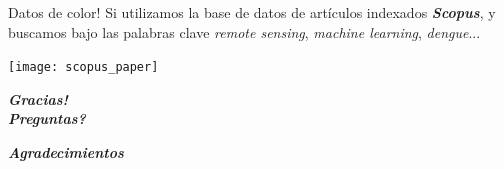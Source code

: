 \documentclass[10pt]{beamer}
\newcommand\IncrFont{\fontsize{20}{20}\selectfont}
\begin{document}
\begin{frame}{Datos de color!}
Si utilizamos la base de datos de artículos indexados \textit{\textbf{Scopus}},
y buscamos bajo las palabras clave \textit{remote sensing}, \textit{machine learning}, \textit{dengue}...
  \begin{center}
    \texttt{[image: scopus\_paper]}
  \end{center}

\end{frame}


\begin{frame}{}
  \IncrFont
  \begin{center}
    \textit{\textbf{Gracias! \\ Preguntas?}}
  \end{center}
\end{frame}


\begin{frame}{}
  \IncrFont
  \begin{center}
    \textit{\textbf{Agradecimientos}}
  \end{center}
\end{frame}







\appendix
\end{document}
